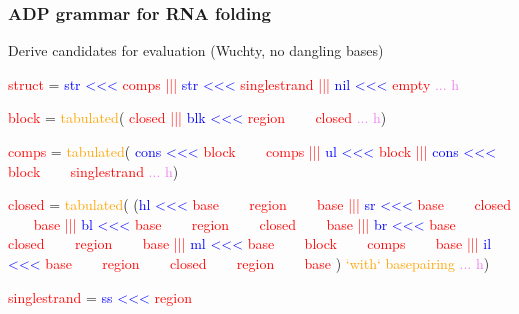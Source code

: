 \documentclass[ignorenonframetext,10pt]{beamer}
\begin{document}
\begin{frame}[fragile]
       \frametitle{\large ADP grammar for RNA folding}
       \small
       \begin{block}{Derive candidates for evaluation (Wuchty, no dangling bases)}
               \scriptsize
               \begin{semiverbatim}
\textcolor{red}{struct}  =  \textcolor{blue}{str  <<<} \textcolor{red}{comps        |||}
           \textcolor{blue}{str  <<<} \textcolor{red}{singlestrand |||}
           \textcolor{blue}{nil  <<<} \textcolor{red}{empty}        \textcolor{violet}{... h}    

\textcolor{red}{block}   = \textcolor{orange}{tabulated}(                      
                    \textcolor{red}{closed            |||}
           \textcolor{blue}{blk  <<<} \textcolor{red}{region ~~~ closed} \textcolor{violet}{... h})

\textcolor{red}{comps}   = \textcolor{orange}{tabulated}(
           \textcolor{blue}{cons <<<} \textcolor{red}{block  ~~~ comps        |||}
           \textcolor{blue}{ul   <<<} \textcolor{red}{block                   |||}
           \textcolor{blue}{cons <<<} \textcolor{red}{block  ~~~ singlestrand} \textcolor{violet}{... h})

\textcolor{red}{closed}  = \textcolor{orange}{tabulated}(
          (\textcolor{blue}{hl <<<} \textcolor{red}{base ~~~            region             ~~~ base  |||}
           \textcolor{blue}{sr <<<} \textcolor{red}{base ~~~            closed             ~~~ base  |||}
           \textcolor{blue}{bl <<<} \textcolor{red}{base ~~~      region ~~~ closed        ~~~ base  |||}
           \textcolor{blue}{br <<<} \textcolor{red}{base ~~~      closed ~~~ region        ~~~ base  |||}
           \textcolor{blue}{ml <<<} \textcolor{red}{base ~~~      block  ~~~ comps         ~~~ base  |||}
           \textcolor{blue}{il <<<} \textcolor{red}{base ~~~ region ~~~ closed  ~~~ region ~~~ base}    )
           \textcolor{orange}{`with` basepairing}               \textcolor{violet}{... h})
                               
\textcolor{red}{singlestrand} =  \textcolor{blue}{ss   <<<} \textcolor{red}{region} 
               \end{semiverbatim}
       \end{block}
\end{frame}
\end{document}
